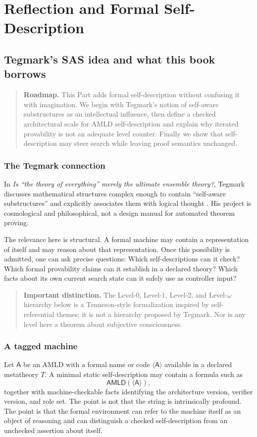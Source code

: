 \documentclass[11pt,openany]{book}
\theoremstyle{definition}
\theoremstyle{remark}
\newenvironment{roadmap}{\begin{quote}\small\color{deepblue}\textbf{Roadmap.} }{\end{quote}}
\newenvironment{warningbox}{\begin{quote}\small\color{red!50!black}\textbf{Important distinction.} }{\end{quote}}
\newcommand{\AMLD}{\ensuremath{\mathsf{AMLD}}\xspace}
\begin{document}
\part{Reflection and Formal Self-Description}

\chapter{Tegmark's SAS idea and what this book borrows}
\begin{roadmap}
This Part adds formal self-description without confusing it with imagination. We begin with Tegmark's notion of self-aware substructures as an intellectual influence, then define a checked architectural scale for AMLD self-description and explain why iterated provability is not an adequate level counter. Finally we show that self-description may steer search while leaving proof semantics unchanged.
\end{roadmap}

\section{The Tegmark connection}
In \emph{Is ``the theory of everything'' merely the ultimate ensemble theory?}, Tegmark discusses mathematical structures complex enough to contain ``self-aware substructures'' and explicitly associates them with logical thought \cite{Tegmark1998}. His project is cosmological and philosophical, not a design manual for automated theorem proving.

The relevance here is structural. A formal machine may contain a representation of itself and may reason about that representation. Once this possibility is admitted, one can ask precise questions: Which self-descriptions can it check? Which formal provability claims can it establish in a declared theory? Which facts about its own current search state can it safely use as controller input?

\begin{warningbox}
The Level-$0$, Level-$1$, Level-$2$, and Level-$\omega$ hierarchy below is a Tenneson-style formalization inspired by self-referential themes; it is not a hierarchy proposed by Tegmark. Nor is any level here a theorem about subjective consciousness.
\end{warningbox}

\section{A tagged machine}
Let $\mathsf A$ be an AMLD with a formal name or code $\langle\mathsf A\rangle$ available in a declared metatheory $T$. A minimal static self-description may contain a formula such as
\[
\AMLD(\langle\mathsf A\rangle),
\]
together with machine-checkable facts identifying the architecture version, verifier version, and role set. The point is not that the string is intrinsically profound. The point is that the formal environment can refer to the machine itself as an object of reasoning and can distinguish a checked self-description from an unchecked assertion about itself.
\end{document}
